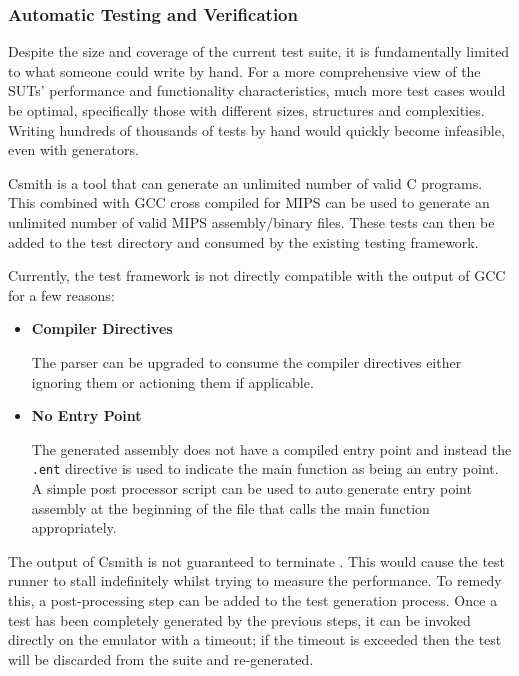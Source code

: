 \subsubsection{Automatic Testing and Verification}

Despite the size and coverage of the current test suite, it is fundamentally limited to what someone could write by hand. For a more comprehensive view of the SUTs' performance and functionality characteristics, much more test cases would be optimal, specifically those with different sizes, structures and complexities. Writing hundreds of thousands of tests by hand would quickly become infeasible, even with generators.

Csmith \cite{csmith} is a tool that can generate an unlimited number of valid C programs. This combined with GCC \cite{gcc} cross compiled for MIPS \cite{mips-gcc} can be used to generate an unlimited number of valid MIPS assembly/binary files. These tests can then be added to the test directory and consumed by the existing testing framework.

Currently, the test framework is not directly compatible with the output of GCC for a few reasons:

\begin{itemize}
    \item \textbf{Compiler Directives}
    
    The parser can be upgraded to consume the compiler directives either ignoring them or actioning them if applicable.

    \item \textbf{No Entry Point}
    
    The generated assembly does not have a compiled entry point and instead the \texttt{.ent} directive is used to indicate the main function as being an entry point. A simple post processor script can be used to auto generate entry point assembly at the beginning of the file that calls the main function appropriately.
\end{itemize}

The output of Csmith is not guaranteed to terminate \cite{csmith-paper}. This would cause the test runner to stall indefinitely whilst trying to measure the performance. To remedy this, a post-processing step can be added to the test generation process. Once a test has been completely generated by the previous steps, it can be invoked directly on the emulator with a timeout; if the timeout is exceeded then the test will be discarded from the suite and re-generated.

